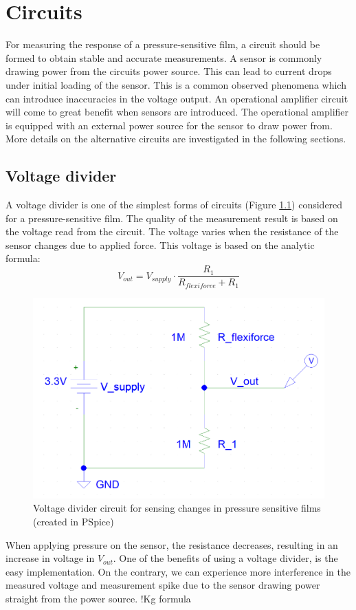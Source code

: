 \chapter{Circuits}
\label{chap:circuits}
For measuring the response of a pressure-sensitive film, a circuit should be formed to obtain stable and accurate measurements. A sensor is commonly drawing power from the circuits power source. This can lead to current drops under initial loading of the sensor. This is a common observed phenomena which can introduce inaccuracies in the voltage output. An operational amplifier circuit will come to great benefit when sensors are introduced. The operational amplifier is equipped with an external power source for the sensor to draw power from. More details on the alternative circuits are investigated in the following sections.

\section{Voltage divider}
\label{sec:vd}
A voltage divider is one of the simplest forms of circuits (Figure \ref{fig:voltagedivider}) considered for a pressure-sensitive film. The quality of the measurement result is based on the voltage read from the circuit. The voltage varies when the resistance of the sensor changes due to applied force. This voltage is based on the analytic formula: 
\begin{equation}
\label{eq:voltagedivider}
    V_{out} = V_{supply} \cdot \frac{R_1}{R_{flexiforce} + R_1}
\end{equation}
\begin{figure}[!b]
    \centering
    \includegraphics[width=.985\linewidth]{figures/voltage_divider.png}
    \caption{Voltage divider circuit for sensing changes in pressure sensitive films (created in PSpice)}
    \label{fig:voltagedivider}
\end{figure}
When applying pressure on the sensor, the resistance decreases, resulting in an increase in voltage in $V_{out}$.  One of the benefits of using a voltage divider, is the easy implementation. On the contrary, we can experience more interference in the measured voltage and measurement spike due to the sensor drawing power straight from the power source. !Kg formula

